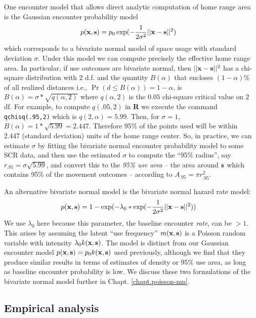 One encounter model that allows direct analytic computation
of home range area is the Gaussian encounter probability model
\[
p({\bf x},{\bf s}) = p_{0} \exp(-\frac{1}{2\sigma^2} ||{\bf x}-{\bf s}||^2)
\]
which corresponds to a bivariate normal model of space usage with
standard deviation $\sigma$.
Under this model
we can compute precisely the effective home range area. In particular,
if use outcomes are bivariate normal, then $||{\bf x}-{\bf s}||^2$ has
a chi-square distribution with 2 d.f. and the quantity $B(\alpha)$
that encloses $(1-\alpha)$\% of all realized distances i.e., $\Pr(d\le
B(\alpha)) = 1-\alpha$, is $B(\alpha) = \sigma*\sqrt{q(\alpha,2)}$
where $q(\alpha,2)$ is the $0.05$ chi-square critical value on $2$ df. For
example, to compute  $q(.05, 2)$ in {\bf R} we execute the  command
\mbox{\tt qchisq(.95,2)}
which is $q(2,\alpha) = 5.99$. Then, for $\sigma=1$, $B(\alpha) =
1*\sqrt{5.99} = 2.447$.  Therefore 95\% of the points used will be
within 2.447 (standard deviation) units of the home range center. So,
in practice,
we can estimate $\sigma$ by fitting the bivariate normal encounter
probability model to some SCR data, and then use the estimated
 $\sigma$ to compute the ``95\% radius'', say  $r_{.95} = \sigma
 \sqrt{5.99}$, and convert this to the {\it 95\% use area} -- the area
around ${\bf s}$ which
 contains 95\% of the movement outcomes  -- according to $A_{.95} = \pi r_{.95}^{2}$.

An alternative bivariate normal model is the bivariate normal hazard
rate model:
\begin{equation}
p({\bf x},{\bf s}) = 1-\exp(-\lambda_{0}*\exp(-\frac{1}{2\sigma^{2}} ||{\bf x}-{\bf s}||^2))
\label{scr0.eq.hazard}
\end{equation}
We use $\lambda_{0}$ here because this parameter, the baseline
encounter {\it rate}, can be $>1$.
This arises by assuming the latent ``use frequency'' $m({\bf x},{\bf
  s})$  is a Poisson random variable with intensity $\lambda_0 k({\bf x},{\bf
  s})$. The model is  distinct from our Gaussian encounter model $p({\bf x},{\bf s}) =
p_0 k({\bf x},{\bf s})$ used previously, although we find
that they produce similar results in terms of estimates of density or
95\% use area, as long as baseline encounter probability is low.
We discuss these two formulations of
the bivariate normal model further in
Chapt. \ref{chapt.poisson-mn}.

\subsection{Empirical analysis}

